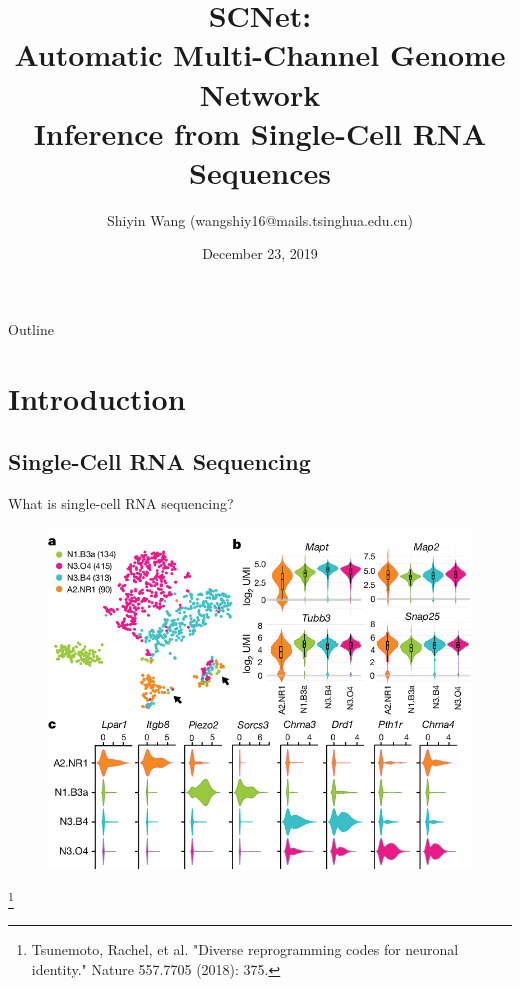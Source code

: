 \documentclass[handout,t]{beamer}
\title[SCNet]{SCNet: \\Automatic Multi-Channel Genome Network \\Inference from Single-Cell RNA Sequences}
\author[Topics in Computational Biology (2019 Autumn)]{Shiyin Wang (wangshiy16@mails.tsinghua.edu.cn)}
\date{December 23, 2019}
\newcommand\blfootnote[1]{%
  \begingroup
  \renewcommand\thefootnote{}\footnote{#1}%
  \addtocounter{footnote}{-1}%
  \endgroup
}
\begin{document}

\frame{\titlepage}
\section[]{}
\begin{frame}{Outline}
  \tableofcontents
\end{frame}



\section{Introduction}
\subsection{Single-Cell RNA Sequencing}
\begin{frame}{What is single-cell RNA sequencing?}
\vspace{-0.4cm}
\begin{figure}
\includegraphics[width=0.65\columnwidth]{Single-cell-RNA-seq-of-four-iN-cell-populations-a-c-Cells-are-colour-coded-as.png}
\end{figure}
\vspace{-0.3cm}
\blfootnote{Tsunemoto, Rachel, et al. "Diverse reprogramming codes for neuronal identity." Nature 557.7705 (2018): 375.}
\end{frame}
\end{document}
